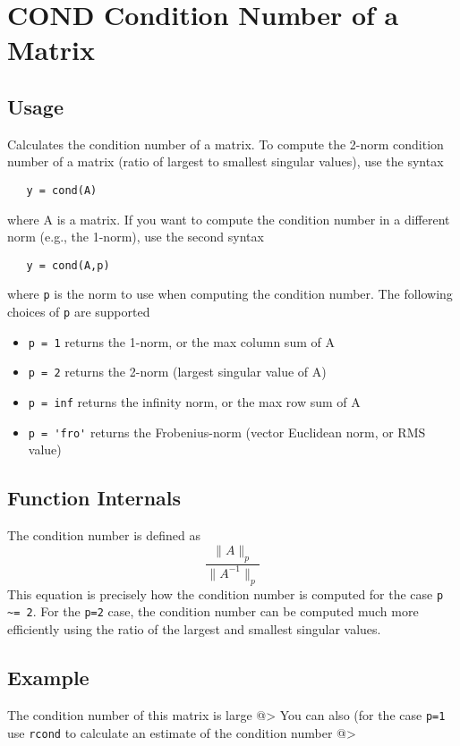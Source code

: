 \section{COND Condition Number of a Matrix}

\subsection{Usage}

Calculates the condition number of a matrix.  To compute the
2-norm condition number of a matrix (ratio of largest to smallest
singular values), use the syntax
\begin{verbatim}
   y = cond(A)
\end{verbatim}
where A is a matrix.  If you want to compute the condition number
in a different norm (e.g., the 1-norm), use the second syntax
\begin{verbatim}
   y = cond(A,p)
\end{verbatim}
where \verb|p| is the norm to use when computing the condition number.
The following choices of \verb|p| are supported
\begin{itemize}
\item  \verb|p = 1| returns the 1-norm, or the max column sum of A

\item  \verb|p = 2| returns the 2-norm (largest singular value of A)

\item  \verb|p = inf| returns the infinity norm, or the max row sum of A

\item  \verb|p = 'fro'| returns the Frobenius-norm (vector Euclidean norm, or RMS value)

\end{itemize}
\subsection{Function Internals}

The condition number is defined as
\[
  \frac{\|A\|_p}{\|A^{-1}\|_p}
\]
This equation is precisely how the condition number is computed for
the case \verb|p ~= 2|.  For the \verb|p=2| case, the condition number can 
be computed much more efficiently using the ratio of the largest and
smallest singular values.
\subsection{Example}

The condition number of this matrix is large
@>
You can also (for the case \verb|p=1| use \verb|rcond| to calculate an estimate
of the condition number
@>
